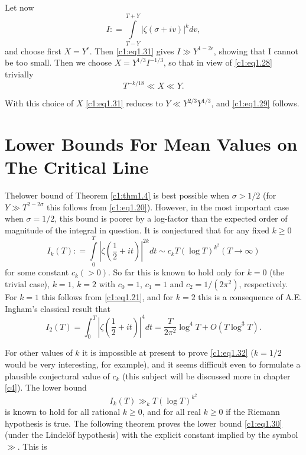 Let now 
$$
I : = \int\limits_{T-Y}^{T+Y} |\zeta (\sigma + iv)|^k dv,
$$
and choose first $X= Y^\epsilon$. Then \eqref{c1:eq1.31} gives $I \gg
Y^{1-2 \epsilon}$, showing that I cannot be too small. Then we choose
  $X= Y^{1/3}I^{-1/3}$, so that in view of \eqref{c1:eq1.28} trivially
$$
T^{-k /18} \ll X \ll Y.
$$

With this choice of $X$ \eqref{c1:eq1.31} reduces to $Y \ll Y^{2/3}
Y^{1/3}$, and \eqref{c1:eq1.29} follows.

\section[Lower Bounds For Mean Values on...]{Lower Bounds For Mean
  Values on The Critical  Line}\label{c1:s4} 

The\pageoriginale lower bound of Theorem \ref{c1:thm1.4} is best
possible when $\sigma > 1/2$ (for $Y \gg T^{2-2\sigma}$ this follows
from \eqref{c1:eq1.20}). However, in the most important case when
$\sigma=1/2$, this bound is poorer by a log-factor than the expected
order of magnitude of the integral in question. It is conjectured that
for any fixed $k \geq 0$
\begin{equation}
I_k (T): = \int\limits_0^T \left|\zeta \left(\frac{1}{2} +
it \right)\right|^{2k}dt \sim c_k T (\log T)^{k^2} (T \to
\infty)\label{c1:eq1.32} 
\end{equation}
for some constant $c_k (> 0)$. So far this is known to hold only for
$k=0$ (the trivial case), $k=1$, $k=2$ with $c_0 =1$, $c_1=1$ and $c_2
= 1/(2\pi^2)$, respectively. For $k=1$ this follows from
\eqref{c1:eq1.21}, and for $k=2$ this is a consequence of
A.E. Ingham's classical result that
\begin{equation}
  I_2 (T)= \int^T_0 \left|\zeta \left(\frac{1}{2}+ it  \right)\right|^4 dt
  = \frac{T}{2 \pi^2} \log^4 T + O (T \log^3 T).\label{c1:eq1.33}
\end{equation}

For other values of $k$ it is impossible at present to prove
\eqref{c1:eq1.32} ($k= 1/2$ would be very interesting, for example),
and it seems difficult even to formulate a plausible conjectural value
of $c_k$ (this subject will be discussed more in chapter \ref{c4}). The lower
bound 
\begin{equation}
  I_k (T) \gg_k T (\log T )^{k^2}\label{c1:eq1.34}
\end{equation}
is known to hold for all rational $k \geq 0$, and for all real $k \geq
0$ if the Riemann hypothesis is true. The following theorem proves the
lower bound \eqref{c1:eq1.30} (under the Lindel\"of hypothesis) with
the explicit constant implied by the symbol $\gg$. This is 

